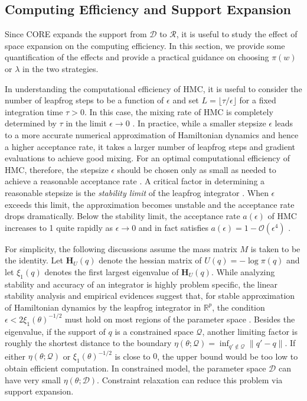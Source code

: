 \documentclass[10pt,fleqn]{article}
\newcommand{\bb}[1]{\mathbb{#1}}
\newcommand{\mc}[1]{\mathcal{#1}}
\DeclareMathOperator{\1}{\mathbbm{1}}
\newcommand{\dt}{\epsilon} %
\newcommand{\mass}{M} %
\newcommand{\hess}{\mathbf{H}} %
\begin{document}
\subsection{Computing Efficiency and Support Expansion}

Since CORE expands the support from $\mc D$ to $\mc
R$, it is useful to study the effect of space expansion on the computing efficiency. In this section, we provide some  quantification of the effects and provide a practical guidance on choosing $\pi(w)$ or $\lambda$ in the
two strategies.


In understanding the computational efficiency of HMC, it is useful to
consider the number of leapfrog steps to be a function of $\dt$ and
set $L = \lfloor \tau / \dt \rfloor$ for a fixed integration
time $\tau > 0$. In this case, the mixing rate of HMC is completely
determined by $\tau$ in the limit $\dt \to 0$ \citep{betancourt17}. In
practice, while a smaller stepsize $\dt$ leads to a more accurate
numerical approximation of Hamiltonian dynamics and hence a higher
acceptance rate, it takes a larger number of leapfrog steps and
gradient evaluations to achieve good mixing. For an optimal
computational efficiency of HMC, therefore, the stepsize $\dt$ should
be chosen only as small as needed to achieve a reasonable acceptance
rate \citep{beskos13, betancourt14}. A critical factor in determining
a reasonable stepsize is the \textit{stability limit} of the leapfrog
integrator \citep{neal2011mcmc}. When $\dt$ exceeds this limit, the
approximation becomes unstable and the acceptance rate drops
dramatically. Below the stability limit, the acceptance rate $a(\dt)$
of HMC increases to 1 quite rapidly as $\dt \to 0$ and in fact
satisfies $a(\dt) = 1 - \mc O(\dt^4)$ \citep{beskos13}.

For simplicity, the following discussions assume the mass matrix $\mass$ is taken to be the identity. Let $\hess_U(q)$ denote the hessian matrix of $U(q) = - \log \pi(q)$ and let $\xi_1(q)$ denotes the first largest eigenvalue of $\hess_U(q)$. While analyzing stability and accuracy of an integrator is highly problem specific, the linear stability analysis and empirical evidences suggest that, for stable approximation of Hamiltonian dynamics by the leapfrog integrator in $\bb R^p$, the condition $\dt < 2\xi_1(\theta)^{-1/2}$ must hold on most regions of the parameter space \citep{hairer06}.
Besides the eigenvalue, if the support of $q$ is a constrained space $\mc Q$, another limiting factor is roughly the shortest distance to the boundary $\eta (\theta; {\mc Q})= \inf_{q'\not\in \mc Q}\|q'-q\|$. If either $\eta (\theta; {\mc Q})$ or $\xi_1(\theta)^{-1/2}$ 
is close to $0$, the upper bound would be too low to obtain efficient computation.
In constrained model, the parameter space $\mc D$ can have very small $\eta(\theta;\mc D)$. Constraint relaxation can reduce this problem via support
expansion. 
\end{document}
